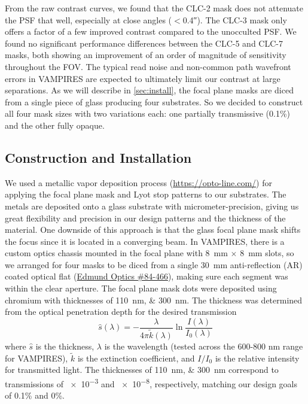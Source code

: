 \documentclass[]{spie}  %
\begin{document}
From the raw contrast curves, we found that the CLC-2 mask does not attenuate the PSF that well, especially at close angles ($<$\ang{;;0.4}). The CLC-3 mask only offers a factor of a few improved contrast compared to the unocculted PSF. We found no significant performance differences between the CLC-5 and CLC-7 masks, both showing an improvement of an order of magnitude of sensitivity throughout the FOV. The typical read noise and non-common path wavefront errors in VAMPIRES are expected to ultimately limit our contrast at large separations. As we will describe in \autoref{sec:install}, the focal plane masks are diced from a single piece of glass producing four substrates. So we decided to construct all four mask sizes with two variations each: one partially transmissive (0.1\%) and the other fully opaque.

\subsection{Construction and Installation}\label{sec:install}

We used a metallic vapor deposition process (\url{https://opto-line.com/}) for applying the focal plane mask and Lyot stop patterns to our substrates. The metals are deposited onto a glass substrate with micrometer-precision, giving us great flexibility and precision in our design patterns and the thickness of the material. One downside of this approach is that the glass focal plane mask shifts the focus since it is located in a converging beam. In VAMPIRES, there is a custom optics chassis mounted in the focal plane with \qty{8}{\milli\meter} $\times$ \qty{8}{\milli\meter} slots, so we arranged for four masks to be diced from a single \qty{30}{\milli\meter} anti-reflection (AR) coated optical flat (\href{https://www.edmundoptics.com/p/30mm-dia-4mm-thick-nir-i-coated-lambda10-fused-silica-window/27562/}{Edmund Optics \#84-466}), making sure each segment was within the clear aperture. The focal plane mask dots were deposited using chromium with thicknesses of \qtylist{110;300}{\nano\meter}. The thickness was determined from the optical penetration depth for the desired transmission
\begin{equation}
    \hat{s}(\lambda) = -\frac{\lambda}{4\pi\tilde{k}(\lambda)}\ln{\frac{I(\lambda)}{I_0(\lambda)}}
    \label{eqn:throughput}
\end{equation}
where $\hat{s}$ is the thickness, $\lambda$ is the wavelength (tested across the 600-800 nm range for VAMPIRES), $\tilde{k}$ is the extinction coefficient, and $I/I_0$ is the relative intensity for transmitted light. The thicknesses of \qtylist{110;300}{\nano\meter} correspond to transmissions of \num{e-3} and \num{e-8}, respectively, matching our design goals of 0.1\% and 0\%.
\end{document}
